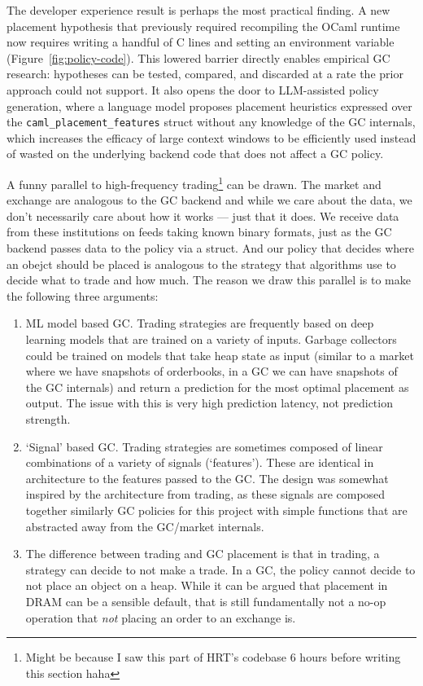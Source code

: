 \documentclass[sigconf]{acmart}
\begin{document}
The developer experience result is perhaps the most practical finding. A new placement hypothesis that previously required recompiling the OCaml runtime now requires writing a handful of C lines and setting an environment variable (Figure~\ref{fig:policy-code}). This lowered barrier directly enables empirical GC research: hypotheses can be tested, compared, and discarded at a rate the prior approach could not support. It also opens the door to LLM-assisted policy generation, where a language model proposes placement heuristics expressed over the \texttt{caml\_placement\_features} struct without any knowledge of the GC internals, which increases the efficacy of large context windows to be efficiently used instead of wasted on the underlying backend code that does not affect a GC policy.

A funny parallel to high-frequency trading\footnote{Might be because I saw this part of HRT's codebase 6 hours before writing this section haha} can be drawn. The market and exchange are analogous to the GC backend and while we care about the data, we don't necessarily care about how it works --- just that it does. We receive data from these institutions on feeds taking known binary formats, just as the GC backend passes data to the policy via a struct. And our policy that decides where an obejct should be placed is analogous to the strategy that algorithms use to decide what to trade and how much. The reason we draw this parallel is to make the following three arguments:
\begin{enumerate}
  \item ML model based GC. Trading strategies are frequently based on deep learning models that are trained on a variety of inputs. Garbage collectors could be trained on models that take heap state as input (similar to a market where we have snapshots of orderbooks, in a GC we can have snapshots of the GC internals) and return a prediction for the most optimal placement as output. The issue with this is very high prediction latency, not prediction strength.
  \item `Signal' based GC. Trading strategies are sometimes composed of linear combinations of a variety of signals (`features'). These are identical in architecture to the features passed to the GC. The design was somewhat inspired by the architecture from trading, as these signals are composed together similarly GC policies for this project with simple functions that are abstracted away from the GC/market internals.
  \item The difference between trading and GC placement is that in trading, a strategy can decide to not make a trade. In a GC, the policy cannot decide to not place an object on a heap. While it can be argued that placement in DRAM can be a sensible default, that is still fundamentally not a no-op operation that \textit{not} placing an order to an exchange is.
\end{enumerate}
\end{document}
